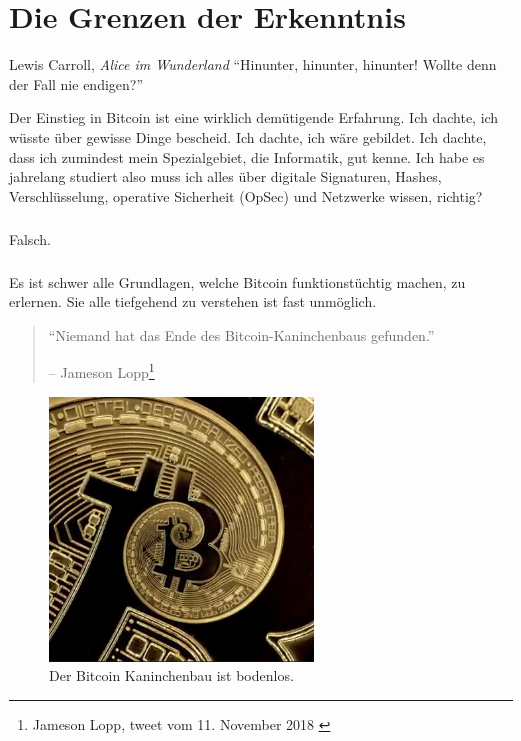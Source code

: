 \chapter{Die Grenzen der Erkenntnis}
\label{les:7}

\begin{chapquote}{Lewis Carroll, \textit{Alice im Wunderland}}
\enquote{Hinunter, hinunter, hinunter! Wollte denn der Fall nie endigen?}
\end{chapquote}

Der Einstieg in Bitcoin ist eine wirklich demütigende Erfahrung. Ich dachte, ich
wüsste über gewisse Dinge bescheid. Ich dachte, ich wäre gebildet. Ich dachte,
dass ich zumindest mein Spezialgebiet, die Informatik, gut kenne. Ich habe es
jahrelang studiert also muss ich alles über digitale Signaturen, Hashes,
Verschlüsselung, operative Sicherheit (OpSec) und Netzwerke wissen, richtig?

\paragraph{}
Falsch.

\paragraph{}
Es ist schwer alle Grundlagen, welche Bitcoin funktionstüchtig machen, zu
erlernen. Sie alle tiefgehend zu verstehen ist fast unmöglich.

\begin{quotation}\begin{samepage}
\enquote{Niemand hat das Ende des Bitcoin-Kaninchenbaus gefunden.}
\begin{flushright} -- Jameson Lopp\footnote{Jameson Lopp, tweet vom 11. November 2018 \cite{lopp-tweet}}
\end{flushright}\end{samepage}\end{quotation}

\begin{figure}
  \centering
  \includegraphics[width=7cm]{assets/images/rabbit-hole-bottomless.png}
  \caption{Der Bitcoin Kaninchenbau ist bodenlos.}
  \label{fig:rabbit-hole-bottomless}
\end{figure}

